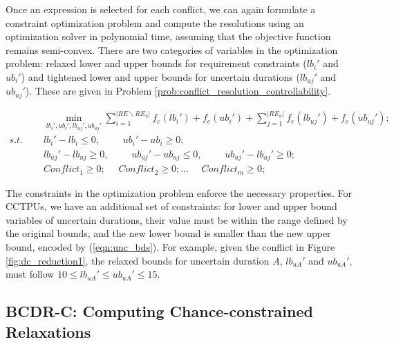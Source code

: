\documentclass[jair,twoside,11pt,theapa]{article}
\begin{document}
Once an expression is selected for each conflict, we can again formulate a
constraint optimization problem and compute the resolutions using an
optimization solver in polynomial time, assuming that the objective function
remains semi-convex. There are two categories of variables in the optimization
problem: relaxed lower and upper bounds for requirement constraints ($lb_i'$ and
$ub_i'$) and tightened lower and upper bounds for uncertain durations
($lb_{uj}'$ and $ub_{uj}'$). These are given in Problem \ref{prob:conflict_resolution_controllability}.

\begin{problem}
	\begin{align}
		&\phantom{=}	\min_{lb_i',ub_i',lb_{uj}',ub_{uj}'}\sum\limits_{i=1}^{|RE\backslash RE_u|}f_{e}(lb_i')+f_{e}(ub_i')+\sum\limits_{j=1}^{|RE_u|}f_{e}(lb_{uj}')+f_{e}(ub_{uj}');\\
		s.t. &\phantom{=} lb_i'-lb_i \leq 0, \quad \phantom{=} ub_i'-ub_i \geq 0; \\
			&\phantom{=} lb_{uj}'-lb_{uj} \geq 0, \quad \phantom{=} ub_{uj}'-ub_{uj} \leq 0, \quad \phantom{=} ub_{uj}'-lb_{uj}' \geq 0; \label{eqn:unc_bds}\\
			&\phantom{=} Conflict_1 \geq 0; \phantom{=} Conflict_2 \geq 0;  ... \phantom{=} Conflict_m \geq 0;
	\end{align}
	\label{prob:conflict_resolution_controllability}
\end{problem}
	

The constraints in the optimization problem enforce the necessary properties.
For CCTPUs, we have an additional set of constraints: for lower and upper bound
variables of uncertain durations, their value must be within the range defined
by the original bounds, and the new lower bound is smaller than the new upper
bound, encoded by (\ref{eqn:unc_bds}). For example, given the conflict in Figure
\ref{fig:dc_reduction1}, the relaxed bounds for uncertain duration $A$, $lb_{uA}'$
and $ub_{uA}'$, must follow $10 \leq lb_{uA}' \leq ub_{uA}' \leq 15$.


\subsection{BCDR-C: Computing Chance-constrained Relaxations}
\end{document}
